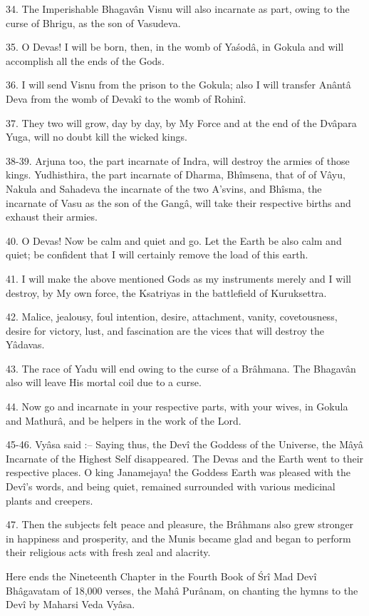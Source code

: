 34. The Imperishable Bhagav\^an Visnu will also incarnate as part, owing to the curse of Bhrigu, as the son of Vasudeva.

35. O Devas! I will be born, then, in the womb of Ya\'sod\^a, in Gokula and will accomplish all the ends of the Gods.

36. I will send Visnu from the prison to the Gokula; also I will transfer An\^ant\^a Deva from the womb of Devak\^i to the womb of Rohin\^i.

37. They two will grow, day by day, by My Force and at the end of the Dv\^apara Yuga, will no doubt kill the wicked kings.

38-39. Arjuna too, the part incarnate of Indra, will destroy the armies of those kings. Yudhisthira, the part incarnate of Dharma, Bh\^imsena, that of of V\^ayu, Nakula and Sahadeva the incarnate of the two A'svins, and Bh\^isma, the incarnate of Vasu as the son of the Gang\^a, will take their respective births and exhaust their armies.

40. O Devas! Now be calm and quiet and go. Let the Earth be also calm and quiet; be confident that I will certainly remove the load of this earth.

41. I will make the above mentioned Gods as my instruments merely and I will destroy, by My own force, the Ksatriyas in the battlefield of Kuruksettra.

42. Malice, jealousy, foul intention, desire, attachment, vanity, covetousness, desire for victory, lust, and fascination are the vices that will destroy the Y\^adavas.

43. The race of Yadu will end owing to the curse of a Br\^ahmana. The Bhagav\^an also will leave His mortal coil due to a curse.

44. Now go and incarnate in your respective parts, with your wives, in Gokula and Mathur\^a, and be helpers in the work of the Lord.

45-46. Vy\^asa said :-- Saying thus, the Dev\^i the Goddess of the Universe, the M\^ay\^a Incarnate of the Highest Self disappeared. The Devas and the Earth went to their respective places. O king Janamejaya! the Goddess Earth was pleased with the Dev\^i's words, and being quiet, remained surrounded with various medicinal plants and creepers.

47. Then the subjects felt peace and pleasure, the Br\^ahmans also grew stronger in happiness and prosperity, and the Munis became glad and began to perform their religious acts with fresh zeal and alacrity.

Here ends the Nineteenth Chapter in the Fourth Book of \'Sr\^i Mad Dev\^i Bh\^agavatam of 18,000 verses, the Mah\^a Pur\^anam, on chanting the hymns to the Dev\^i by Maharsi Veda Vy\^asa.